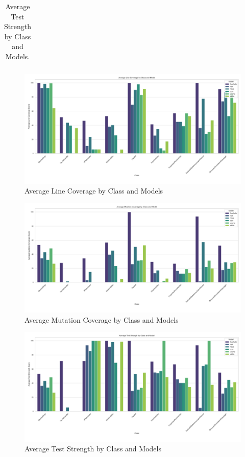 \begin{table}[H]
\begin{tabular}{| l | r | r | r | r | r | r |}
\end{tabular}
\caption{Average Test Strength by Class and Models.}
\label{tab:test_strength}
\end{table}

\begin{figure}[H]
\centering
\includegraphics[width=1\textwidth]{images/line_coverage_avg.png}
\caption{Average Line Coverage by Class and Models}
\label{fig:line_coverage}
\end{figure}

\begin{figure}[H]
\centering
\includegraphics[width=1\textwidth]{images/mutation_coverage_avg.png}
\caption{Average Mutation Coverage by Class and Models}
\label{fig:mutation_coverage}
\end{figure}

\begin{figure}[H]
\centering
\includegraphics[width=1\textwidth]{images/test_strength_avg.png}
\caption{Average Test Strength by Class and Models}
\label{fig:test_strength}
\end{figure}

